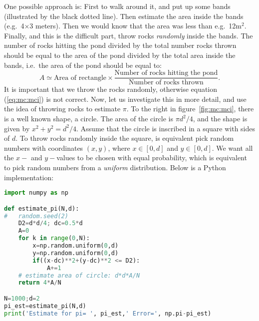 \documentclass[graybox,sectrefs,envcountresetchap,open=right,final]{svmonodo}
\begin{document}
One possible approach is: First to walk around it, and put up some bands (illustrated by the black dotted line).
Then estimate the area inside the bands (e.g.~4$\times$3 meters). Then
we would know that the area was less than e.g.~12m$^2$. Finally,
and this is the difficult part, throw rocks \emph{randomly} inside the
bands. The number of rocks hitting the pond divided by the total
number rocks thrown should be equal to the area of the pond divided by
the total area inside the bands, i.e.~the area of the pond should be
equal to:
\begin{equation}
A\simeq\text{Area of rectangle}\times\frac{\text{Number of rocks hitting the pond}}{\text{Number of rocks thrown}}.
\label{eq:mc:mci}
\end{equation}
It is important that we throw the rocks randomly, otherwise  equation (\ref{eq:mc:mci}) is not correct. Now, let us
investigate this in more detail, and use the idea of throwing rocks to estimate $\pi$. To the right in figure~\ref{fig:mc:mci},
there is a well known shape, a circle. The area of the circle is $\pi d^2/4$, and the shape is given by $x^2+y^2=d^2/4$. Assume that
the circle is inscribed in a square with sides of $d$. To throw rocks randomly inside the square, is equivalent pick random numbers
with coordinates $(x,y)$, where $x\in[0,d]$ and $y\in[0,d]$. We want all the $x-$ and $y-$values to be chosen with equal probability,
which is equivalent to pick random numbers from a \emph{uniform} distribution. Below is a Python implementation:


















\begin{lstlisting}[language=python,style=blue1]
import numpy as np

def estimate_pi(N,d):
#   random.seed(2)
    D2=d*d/4; dc=0.5*d
    A=0
    for k in range(0,N):
        x=np.random.uniform(0,d)
        y=np.random.uniform(0,d)
        if((x-dc)**2+(y-dc)**2 <= D2):
            A+=1
    # estimate area of circle: d*d*A/N
    return 4*A/N

N=1000;d=2
pi_est=estimate_pi(N,d)
print('Estimate for pi= ', pi_est,' Error=', np.pi-pi_est)

\end{lstlisting}
\end{document}
